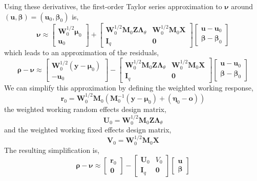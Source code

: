 \documentclass{jss}
\begin{document}
Using these derivatives, the first-order Taylor series approximation
to $\bm\nu$ around $(\bm u, \bm\beta) = (\bm u_0, \bm\beta_0)$ is,
\begin{equation}
\bm\nu \approx
\begin{bmatrix}
\bm W_0^{1/2}\bm \mu_0 \\
\bm u_0
\end{bmatrix} + 
\begin{bmatrix}
\bm W_0^{1/2}\bm M_0 \bm Z \bm\Lambda_\theta & \bm W_0^{1/2}\bm M_0 \bm X \\
\bm I_q & \bm 0
\end{bmatrix}
\begin{bmatrix}
\bm u - \bm u_0 \\
\bm\beta - \bm\beta_0 
\end{bmatrix}
\end{equation}
which leads to an approximation of the residuals,
\begin{equation}
\bm\rho - \bm\nu \approx
\begin{bmatrix}
\bm W_0^{1/2}(\bm y - \bm\mu_0) \\
-\bm u_0
\end{bmatrix} - 
\begin{bmatrix}
\bm W_0^{1/2}\bm M_0 \bm Z \bm\Lambda_\theta & \bm W_0^{1/2}\bm M_0 \bm X \\
\bm I_q & \bm 0
\end{bmatrix}
\begin{bmatrix}
\bm u - \bm u_0 \\
\bm\beta - \bm\beta_0 
\end{bmatrix}
\end{equation}
We can simplify this approximation by defining the weighted working
response,
\begin{equation}
\bm r_0 = \bm W_0^{1/2} \bm M_0 (\bm M_0^{-1} (\bm y - \bm\mu_0) +
(\bm\eta_0 - \bm o))
\label{eq:weightedworkingresiduals}
\end{equation}
the weighted working random effects design matrix,
\begin{equation}
\bm U_0 = \bm W_0^{1/2} \bm M_0 \bm Z \bm\Lambda_\theta
\end{equation}
and the weighted working fixed effects design matrix,
\begin{equation}
\bm V_0 = \bm W_0^{1/2} \bm M_0 \bm X
\end{equation}
The resulting simplification is,
\begin{equation}
\bm\rho - \bm\nu \approx
\begin{bmatrix}
\bm r_0 \\
\bm 0
\end{bmatrix} - 
\begin{bmatrix}
\bm U_0 & V_0 \\
\bm I_q & \bm 0
\end{bmatrix}
\begin{bmatrix}
\bm u \\
\bm\beta
\end{bmatrix}
\end{equation}
\end{document}
